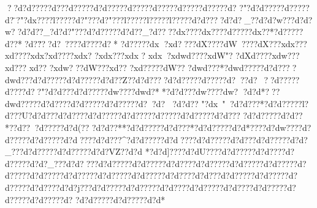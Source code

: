 ??d?d?????d?\???d?\?????d?d?????d?\?????d?\?????d?\?????d?\?????d?\?
?"?d?d?????d?\?????d?\"?"?dx\?????l?\?????d?\?"???d?\?"???l?\?????l?\?????l?\?????d?d????d?d?_??d?d?w???d?d?w??d?d??_?d?d?"???d?d?????d?d??_?d?\????dx\?????dx\????d?\*????dx\ ??*?d?\?????d?\*?*?d?\"???d????d?\?? ??d?\?*
?d?\*????dx\*
?xd?\????dX\?????dW???dX\????xdx\????xd?\????xdx\??xd?\????xdx\??
?xdx\????xdx\?
?
xdx\*?xdwd????xdW\?"?
?dXd????xdw\????xd?\???
xd?\*?
?xdw\????dW\????xd?\*?
?xd?\*????dW\???
?dwd???*?dwd?????d?d????dwd??  ?d?d?????d?d?????d?d??Z??d?d????d?d?????d?\?????d?\ ??d?\ ??d?\?????d?\????d?\??"?d?d???d?d?????dw\?????dwd?**?d?d???dw\*????dw\??
?d?d*???dwd?????d?d????d?d?????d?d?????d?\? ?d?\  ?d?d??
"?dx\
"?d?d???*?d?d?????l?d???U?d?d???d?d????d?d?????d?d?????d?\*????d?d?????d?d??? ?d?d?????d?d??*??d?\???d?\?????d?d(??
?d?d??**?d?d?????d?d???*?d?d?????d?d*????d?dw????d?d?????d?d?????d?d????d?d???^?d?d?????d?d????d?d?????d?d???d?d?????d?d?_???d?d?????d?d?????d?d?VZ??d?d
  *?d?d]????d?dU????d?d?????d?d????d?d?????d?d?_???d?d????d?d?????d?d?????d?d????d?d?????d?d?????d?d?????d?d?????d?d?????d?d?????d?d?????d?d?????d?d????d?d???d?d?????d?d?????d?d?????d?d????d?d?j???d?d?????d?d?????d?d????d?d?????d?d????d?d?????d?d?????d?d?????d?\?   ?d?d?????d?d?????d?d*

